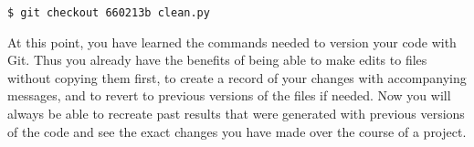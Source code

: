 \begin{verbatim}
$ git checkout 660213b clean.py
\end{verbatim}

At this point, you have learned the commands needed to version your code with Git.
Thus you already have the benefits of being able to make edits to files without copying them first, to create a record of your changes with accompanying messages, and to revert to previous versions of the files if needed.
Now you will always be able to recreate past results that were generated with previous versions of the code and see the exact changes you have made over the course of a project.





  
  
  
  
  
  
  
  
  
  
  